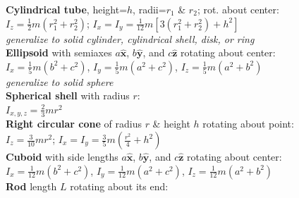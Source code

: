 \documentclass[letterpaper,landscape,10pt]{article}
\newenvironment{mydescription}
{\begin{description}
	\setlength{\itemsep}{0pt}
	\setlength{\parskip}{0pt}
	\setlength{\parsep}{-1pt}}
{\end{description}}
\begin{document}
{\begin{multicols}{4}
\begin{mydescription}
				\hspace{-5pt}\textbf{Cylindrical tube}, height=$h$, radii=$r_1$ \& $r_2$; rot. about center: \\
				$I_z = \frac{1}{2}m\left( r_1^2+r_2^2 \right)$;\hspace{5pt} $I_x = I_y = \frac{1}{12}m\left[ 3\left( r_1^2+r_2^2 \right) + h^2\right]$ \\
				\textit{generalize to solid cylinder, cylindrical shell, disk, or ring}\\
				\vspace{2.5pt}
				\hspace{-5pt}\textbf{Ellipsoid} with semiaxes $a \hat{\bm{x}}$, $b \hat{\bm{y}}$, and $c \hat{\bm{z}}$ rotating about center:\\
				$I_x = \frac{1}{5}m\left( b^2+c^2 \right)$,\hspace{2.5pt} $I_y = \frac{1}{5}m\left( a^2+c^2 \right)$,\hspace{2.5pt} $I_z = \frac{1}{5}m\left( a^2+b^2 \right)$ \\
				\textit{generalize to solid sphere}\\
				\vspace{2.5pt}
				\hspace{-5pt}\textbf{Spherical shell} with radius $r$: \\
				$I_{x,y,z} = \frac{2}{3}mr^2$ \\
				\vspace{2.5pt}
				\hspace{-5pt}\textbf{Right circular cone} of radius $r$ \& height $h$ rotating about point: \\
				$I_z = \frac{3}{10}mr^2$;\hspace{5pt} $I_x = I_y = \frac{3}{5}m\left( \frac{r^2}{4}+h^2\right)$ \\
				\vspace{2.5pt}
				\hspace{-5pt}\textbf{Cuboid} with side lengths $a \hat{\bm{x}}$, $b \hat{\bm{y}}$, and $c \hat{\bm{z}}$ rotating about center:\\
				$I_x = \frac{1}{12}m\left( b^2+c^2 \right)$,\hspace{0.0pt} $I_y = \frac{1}{12}m\left( a^2+c^2 \right)$,\hspace{0.0pt} $I_z = \frac{1}{12}m\left( a^2+b^2 \right)$ \\
				\vspace{2.5pt}
				\hspace{-5pt}\textbf{Rod} length $L$ rotating about its end:\\

\end{mydescription}
\end{multicols}}
\end{document}
